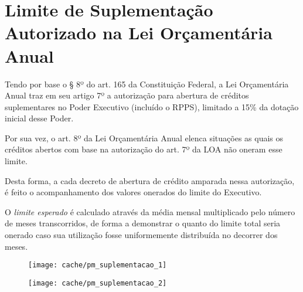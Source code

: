 
\section[Limite de Suplementação]{Limite de Suplementação Autorizado na Lei Orçamentária Anual}

Tendo por base o § 8º do art. 165 da Constituição Federal, a Lei Orçamentária Anual traz em seu artigo 7º a autorização para abertura de créditos suplementares no Poder Executivo (incluído o RPPS), limitado a 15\% da dotação inicial desse Poder.

Por sua vez, o art. 8º da Lei Orçamentária Anual elenca situações as quais os créditos abertos com base na autorização do art. 7º da LOA não oneram esse limite.

Desta forma, a cada decreto de abertura de crédito amparada nessa autorização, é feito o acompanhamento dos valores onerados do limite do Executivo.



O \textit{limite esperado} é calculado através da média mensal multiplicado pelo número de meses transcorridos, de forma a demonstrar o quanto do limite total seria onerado caso sua utilização fosse uniformemente distribuída no decorrer dos meses.

\begin{figure}[H]
\center
\texttt{[image: cache/pm\_suplementacao\_1]}
\end{figure}

\begin{figure}[H]
\center
\texttt{[image: cache/pm\_suplementacao\_2]}
\end{figure}